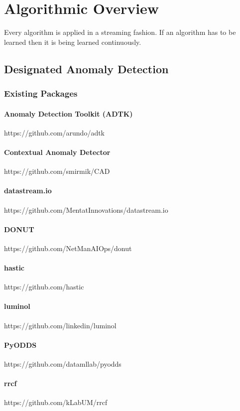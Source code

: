 \section{Algorithmic Overview}
Every algorithm is applied in a streaming fashion. If an algorithm has to be
learned then it is being learned continuously.

\subsection{Designated Anomaly Detection}
\subsubsection{Existing Packages}
\paragraph{Anomaly Detection Toolkit (ADTK)}
https://github.com/arundo/adtk

\paragraph{Contextual Anomaly Detector}
https://github.com/smirmik/CAD

\paragraph{datastream.io}
https://github.com/MentatInnovations/datastream.io

\paragraph{DONUT}
https://github.com/NetManAIOps/donut

\paragraph{hastic}
https://github.com/hastic

\paragraph{luminol}
https://github.com/linkedin/luminol

\paragraph{PyODDS}
https://github.com/datamllab/pyodds

\paragraph{rrcf}
https://github.com/kLabUM/rrcf

